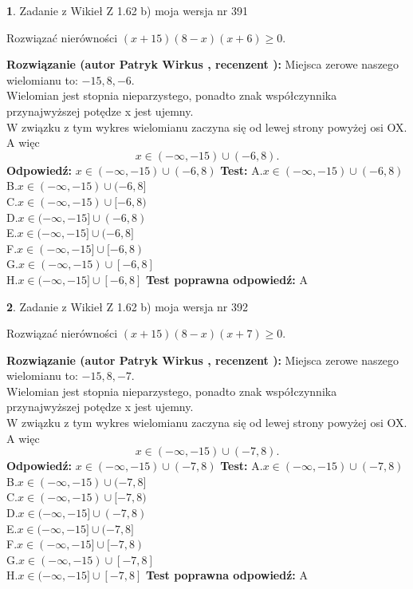 \documentclass[12pt, a4paper]{article}
\theoremstyle{definition} %
\newtheorem{zad}{}
\newcommand{\zadStart}[1]{\begin{zad}#1\newline}
\newcommand{\zadStop}{\end{zad}}
\newcommand{\rozwStart}[2]{\noindent \textbf{Rozwiązanie (autor #1 , recenzent #2): }\newline}
\newcommand{\rozwStop}{\newline}
\newcommand{\odpStart}{\noindent \textbf{Odpowiedź:}\newline}
\newcommand{\odpStop}{\newline}
\newcommand{\testStart}{\noindent \textbf{Test:}\newline}
\newcommand{\testStop}{\newline}
\newcommand{\kluczStart}{\noindent \textbf{Test poprawna odpowiedź:}\newline}
\newcommand{\kluczStop}{\newline}
\begin{document}
\zadStart{Zadanie z Wikieł Z 1.62 b) moja wersja nr 391}

Rozwiązać nierówności $(x+15)(8-x)(x+6)\ge0$.
\zadStop
\rozwStart{Patryk Wirkus}{}
Miejsca zerowe naszego wielomianu to: $-15, 8, -6$.\\
Wielomian jest stopnia nieparzystego, ponadto znak współczynnika przy\linebreak najwyższej potędze x jest ujemny.\\ W związku z tym wykres wielomianu zaczyna się od lewej strony powyżej osi OX. A więc $$x \in (-\infty,-15) \cup (-6,8).$$
\rozwStop
\odpStart
$x \in (-\infty,-15) \cup (-6,8)$
\odpStop
\testStart
A.$x \in (-\infty,-15) \cup (-6,8)$\\
B.$x \in (-\infty,-15) \cup (-6,8]$\\
C.$x \in (-\infty,-15) \cup [-6,8)$\\
D.$x \in (-\infty,-15] \cup (-6,8)$\\
E.$x \in (-\infty,-15] \cup (-6,8]$\\
F.$x \in (-\infty,-15] \cup [-6,8)$\\
G.$x \in (-\infty,-15) \cup [-6,8]$\\
H.$x \in (-\infty,-15] \cup [-6,8]$
\testStop
\kluczStart
A
\kluczStop



\zadStart{Zadanie z Wikieł Z 1.62 b) moja wersja nr 392}

Rozwiązać nierówności $(x+15)(8-x)(x+7)\ge0$.
\zadStop
\rozwStart{Patryk Wirkus}{}
Miejsca zerowe naszego wielomianu to: $-15, 8, -7$.\\
Wielomian jest stopnia nieparzystego, ponadto znak współczynnika przy\linebreak najwyższej potędze x jest ujemny.\\ W związku z tym wykres wielomianu zaczyna się od lewej strony powyżej osi OX. A więc $$x \in (-\infty,-15) \cup (-7,8).$$
\rozwStop
\odpStart
$x \in (-\infty,-15) \cup (-7,8)$
\odpStop
\testStart
A.$x \in (-\infty,-15) \cup (-7,8)$\\
B.$x \in (-\infty,-15) \cup (-7,8]$\\
C.$x \in (-\infty,-15) \cup [-7,8)$\\
D.$x \in (-\infty,-15] \cup (-7,8)$\\
E.$x \in (-\infty,-15] \cup (-7,8]$\\
F.$x \in (-\infty,-15] \cup [-7,8)$\\
G.$x \in (-\infty,-15) \cup [-7,8]$\\
H.$x \in (-\infty,-15] \cup [-7,8]$
\testStop
\kluczStart
A
\kluczStop
\end{document}

